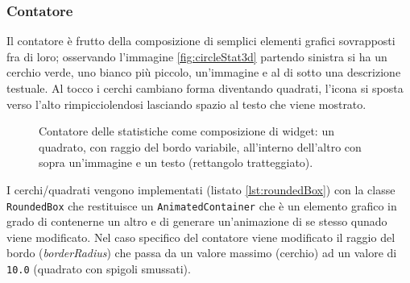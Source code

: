 \subsubsection{Contatore}
Il contatore è frutto della composizione di semplici elementi grafici sovrapposti fra di loro; osservando l'immagine \ref{fig:circleStat3d} partendo sinistra si ha un cerchio verde, uno bianco più piccolo, un'immagine e al di sotto una descrizione testuale. Al tocco i cerchi cambiano forma diventando quadrati, l'icona si sposta verso l'alto rimpicciolendosi lasciando spazio al testo che viene mostrato.
\begin{figure}[h]
  \centering
  \caption[Contatore come composizione di widget]{Contatore delle statistiche come composizione di widget: un quadrato, con raggio del bordo variabile, all'interno dell'altro con sopra un'immagine e un testo (rettangolo tratteggiato).}
  \label{fig:statCont3d}
\end{figure}
%

I cerchi/quadrati vengono implementati (listato \ref{lst:roundedBox}) con la classe \texttt{RoundedBox} che restituisce un \texttt{AnimatedContainer} che è un elemento grafico in grado di contenerne un altro e di generare un'animazione di se stesso qunado viene modificato.
Nel caso specifico del contatore viene modificato il raggio del bordo (\textit{borderRadius}) che passa da un valore massimo (cerchio) ad un valore di \texttt{10.0} (quadrato con spigoli smussati).

